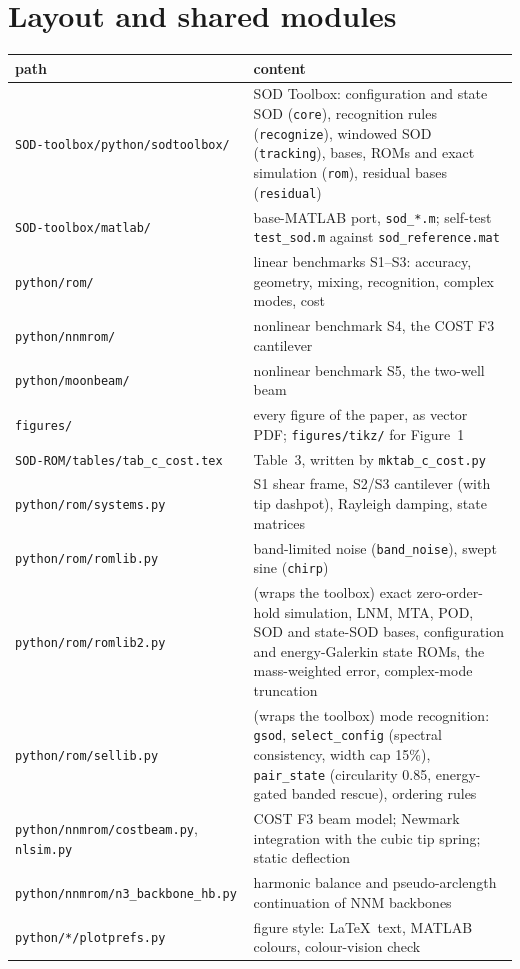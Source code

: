 \documentclass[10pt]{article}
\newcommand{\f}[1]{\texttt{#1}}
\begin{document}
\section{Layout and shared modules}
\begin{longtable}{L{0.30\textwidth}L{0.64\textwidth}}
\toprule
path & content\\ \midrule
\f{SOD-toolbox/\allowbreak{}python/\allowbreak{}sodtoolbox/\allowbreak{}} & SOD Toolbox: configuration and state SOD (\f{core}), recognition rules (\f{recognize}), windowed SOD (\f{tracking}), bases, ROMs and exact simulation (\f{rom}), residual bases (\f{residual})\\
\f{SOD-toolbox/\allowbreak{}matlab/\allowbreak{}} & base-MATLAB port, \f{sod\_\allowbreak{}*.m}; self-test \f{test\_\allowbreak{}sod.m} against \f{sod\_\allowbreak{}reference.mat}\\
\f{python/\allowbreak{}rom/\allowbreak{}} & linear benchmarks S1--S3: accuracy, geometry, mixing, recognition, complex modes, cost\\
\f{python/\allowbreak{}nnmrom/\allowbreak{}} & nonlinear benchmark S4, the COST F3 cantilever\\
\f{python/\allowbreak{}moonbeam/\allowbreak{}} & nonlinear benchmark S5, the two-well beam\\
\f{figures/\allowbreak{}} & every figure of the paper, as vector PDF; \f{figures/\allowbreak{}tikz/\allowbreak{}} for Figure~1\\
\f{SOD-ROM/\allowbreak{}tables/\allowbreak{}tab\_\allowbreak{}c\_\allowbreak{}cost.tex} & Table~3, written by \f{mktab\_\allowbreak{}c\_\allowbreak{}cost.py}\\
\f{python/\allowbreak{}rom/\allowbreak{}systems.py} & S1 shear frame, S2/S3 cantilever (with tip dashpot), Rayleigh damping, state matrices\\
\f{python/\allowbreak{}rom/\allowbreak{}romlib.py} & band-limited noise (\f{band\_\allowbreak{}noise}), swept sine (\f{chirp})\\
\f{python/\allowbreak{}rom/\allowbreak{}romlib2.py} & (wraps the toolbox) exact zero-order-hold simulation, LNM, MTA, POD, SOD and state-SOD bases, configuration and energy-Galerkin state ROMs, the mass-weighted error, complex-mode truncation\\
\f{python/\allowbreak{}rom/\allowbreak{}sellib.py} & (wraps the toolbox) mode recognition: \f{gsod}, \f{select\_\allowbreak{}config} (spectral consistency, width cap 15\%), \f{pair\_\allowbreak{}state} (circularity 0.85, energy-gated banded rescue), ordering rules\\
\f{python/\allowbreak{}nnmrom/\allowbreak{}costbeam.py}, \f{nlsim.py} & COST F3 beam model; Newmark integration with the cubic tip spring; static deflection\\
\f{python/\allowbreak{}nnmrom/\allowbreak{}n3\_\allowbreak{}backbone\_\allowbreak{}hb.py} & harmonic balance and pseudo-arclength continuation of NNM backbones\\
\f{python/\allowbreak{}*/\allowbreak{}plotprefs.py} & figure style: \LaTeX\ text, MATLAB colours, colour-vision check\\
\bottomrule
\end{longtable}
\end{document}
